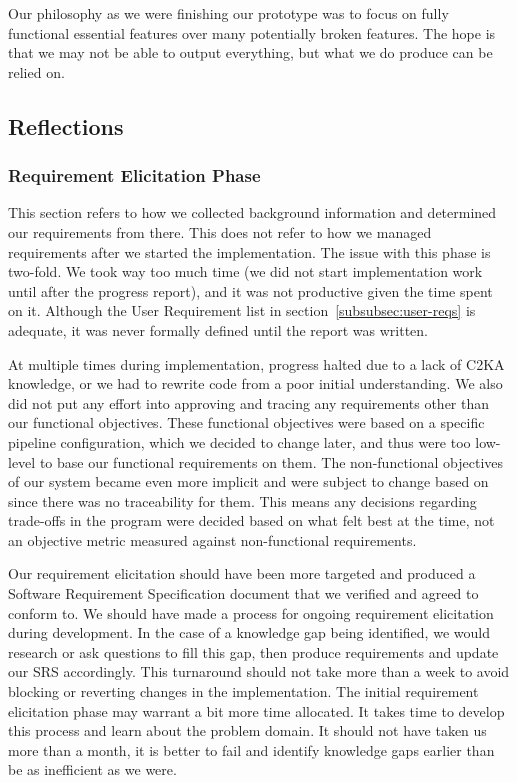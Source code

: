 Our philosophy as we were finishing our prototype was to focus on fully functional essential features over many potentially broken features.
The hope is that we may not be able to output everything, but what we do produce can be relied on.


\subsection{Reflections}\label{subsec:reflections}
\subsubsection{Requirement Elicitation Phase}\label{subsubsec:req-elicit-refl}
This section refers to how we collected background information and determined our requirements from there.
This does not refer to how we managed requirements after we started the implementation.
The issue with this phase is two-fold.
We took way too much time (we did not start implementation work until after the progress report), and it was not productive given the time spent on it.
Although the User Requirement list in section~\ref{subsubsec:user-reqs} is adequate, it was never formally defined until the report was written.

At multiple times during implementation, progress halted due to a lack of C2KA knowledge,
or we had to rewrite code from a poor initial understanding.
We also did not put any effort into approving and tracing any requirements other than our functional objectives.
These functional objectives were based on a specific pipeline configuration, which we decided to change later,
and thus were too low-level to base our functional requirements on them.
The non-functional objectives of our system became even more implicit and were subject to change based on
since there was no traceability for them.
This means any decisions regarding trade-offs in the program were decided based on what felt best at the time,
not an objective metric measured against non-functional requirements.

Our requirement elicitation should have been more targeted and produced a Software Requirement Specification document that we verified and agreed to conform to.
We should have made a process for ongoing requirement elicitation during development.
In the case of a knowledge gap being identified, we would research or ask questions to fill this gap,
then produce requirements and update our SRS accordingly.
This turnaround should not take more than a week to avoid blocking or reverting changes in the implementation.
The initial requirement elicitation phase may warrant a bit more time allocated.
It takes time to develop this process and learn about the problem domain.
It should not have taken us more than a month,
it is better to fail and identify knowledge gaps earlier than be as inefficient as we were.

